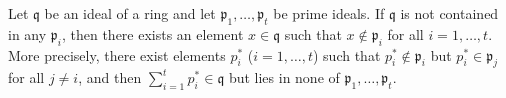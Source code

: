 Let $\mathfrak{q}$ be an ideal of a ring and let $\mathfrak{p}_1, \ldots, \mathfrak{p}_t$ be prime ideals. If $\mathfrak{q}$ is not contained in any $\mathfrak{p}_i$, then there exists an element $x \in \mathfrak{q}$ such that $x \notin \mathfrak{p}_i$ for all $i = 1, \ldots, t$. More precisely, there exist elements $p_i^*$ ($i = 1, \ldots, t$) such that $p_i^* \notin \mathfrak{p}_i$ but $p_i^* \in \mathfrak{p}_j$ for all $j \neq i$, and then $\sum_{i=1}^t p_i^* \in \mathfrak{q}$ but lies in none of $\mathfrak{p}_1, \ldots, \mathfrak{p}_t$.
